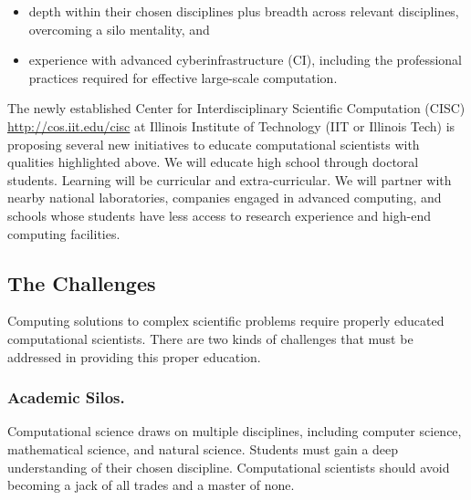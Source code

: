 \documentclass[11pt]{NSFamsart}
\begin{document}
\begin{itemize}
\item depth within their chosen disciplines plus breadth across relevant disciplines, overcoming a silo mentality, and
\item experience with advanced cyberinfrastructure (CI), including the professional practices required for effective large-scale computation.
\end{itemize}

The newly established Center for Interdisciplinary Scientific Computation (CISC) \url{http://cos.iit.edu/cisc} at Illinois Institute of Technology (IIT or Illinois Tech) is proposing several new initiatives to educate computational scientists with qualities highlighted above.  We will educate high school through doctoral students.  Learning will be curricular and extra-curricular.  We will partner with nearby national laboratories, companies engaged in advanced computing, and schools whose students have less access to research experience and high-end computing facilities.

\subsection*{The Challenges}
Computing solutions to complex scientific problems require properly educated computational scientists.  There are two kinds of challenges that must be addressed in providing this proper education.

\subsubsection*{Academic Silos.} Computational science draws on multiple disciplines, including computer science, mathematical science, and natural science.  Students must gain a deep understanding of their chosen discipline. Computational scientists should avoid becoming a jack of all trades and a master of none.
\end{document}

